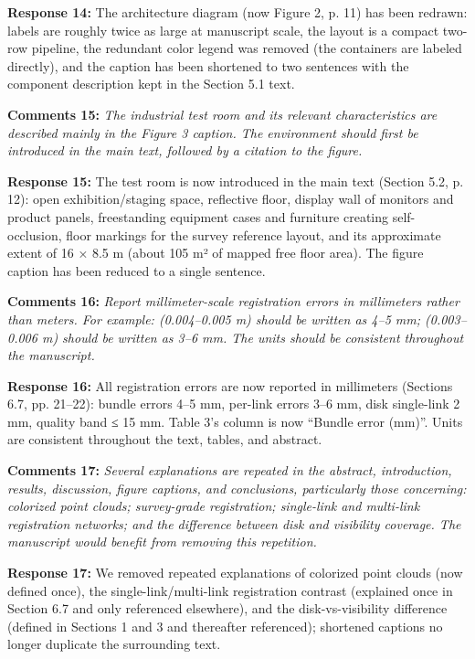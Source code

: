 \documentclass[11pt]{article}
\begin{document}
\textbf{Response 14:} The architecture diagram (now Figure 2, p. 11) has been redrawn: labels are roughly twice as large at manuscript scale, the layout is a compact two-row pipeline, the redundant color legend was removed (the containers are labeled directly), and the caption has been shortened to two sentences with the component description kept in the Section 5.1 text.

\medskip

\textbf{Comments 15:} \emph{The industrial test room and its relevant characteristics are described mainly in the Figure 3 caption. The environment should first be introduced in the main text, followed by a citation to the figure.}

\textbf{Response 15:} The test room is now introduced in the main text (Section 5.2, p. 12): open exhibition/staging space, reflective floor, display wall of monitors and product panels, freestanding equipment cases and furniture creating self-occlusion, floor markings for the survey reference layout, and its approximate extent of 16 × 8.5 m (about 105 m² of mapped free floor area). The figure caption has been reduced to a single sentence.

\medskip

\textbf{Comments 16:} \emph{Report millimeter-scale registration errors in millimeters rather than meters. For example: (0.004–0.005 m) should be written as 4–5 mm; (0.003–0.006 m) should be written as 3–6 mm. The units should be consistent throughout the manuscript.}

\textbf{Response 16:} All registration errors are now reported in millimeters (Sections 6.7, pp. 21–22): bundle errors 4–5 mm, per-link errors 3–6 mm, disk single-link 2 mm, quality band ≤ 15 mm. Table 3’s column is now “Bundle error (mm)”. Units are consistent throughout the text, tables, and abstract.

\medskip

\textbf{Comments 17:} \emph{Several explanations are repeated in the abstract, introduction, results, discussion, figure captions, and conclusions, particularly those concerning: colorized point clouds; survey-grade registration; single-link and multi-link registration networks; and the difference between disk and visibility coverage. The manuscript would benefit from removing this repetition.}

\textbf{Response 17:} We removed repeated explanations of colorized point clouds (now defined once), the single-link/multi-link registration contrast (explained once in Section 6.7 and only referenced elsewhere), and the disk-vs-visibility difference (defined in Sections 1 and 3 and thereafter referenced); shortened captions no longer duplicate the surrounding text.
\end{document}

